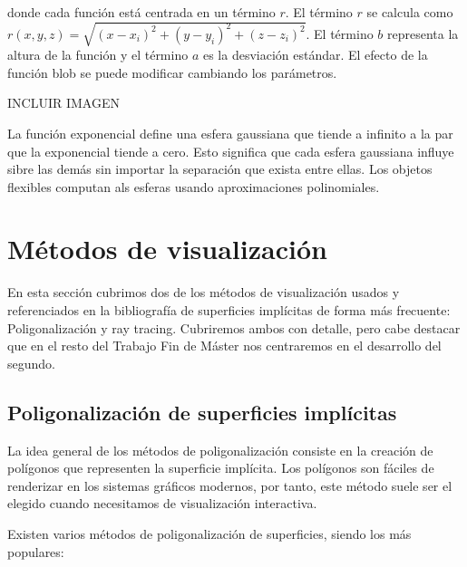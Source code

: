 donde cada función está centrada en un término $r$. El término $r$ se calcula como $r(x,y,z) = \sqrt{(x - x_i)^2 + (y-y_i)^2 + (z-z_i)^2}$. El término $b$ representa la altura de la función y el término $a$ es la desviación estándar. El efecto de la función blob se puede modificar cambiando los parámetros.
\par INCLUIR IMAGEN
\par La función exponencial define una esfera gaussiana que tiende a infinito a la par que la exponencial tiende a cero. Esto significa que cada esfera gaussiana influye sibre las demás sin importar la separación que exista entre ellas. Los objetos flexibles\cite{Wyvill86} computan als esferas usando aproximaciones polinomiales.

\section{Métodos de visualización}

En esta sección cubrimos dos de los métodos de visualización usados y referenciados en la bibliografía de superficies implícitas de forma más frecuente: Poligonalización y ray tracing. Cubriremos ambos con detalle, pero cabe destacar que en el resto del Trabajo Fin de Máster nos centraremos en el desarrollo del segundo.

\subsection{Poligonalización de superficies implícitas}

La idea general de los métodos de poligonalización consiste en la creación de polígonos que representen la superficie implícita. Los polígonos son fáciles de renderizar en los sistemas gráficos modernos, por tanto, este método suele ser el elegido cuando necesitamos de visualización interactiva.
\par Existen varios métodos  de poligonalización de superficies, siendo los más populares:

